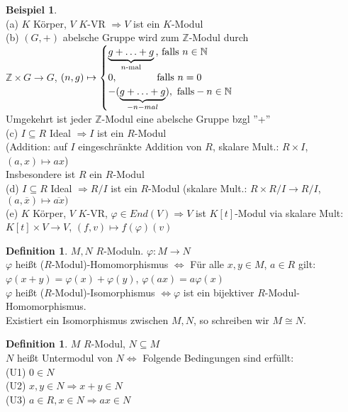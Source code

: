 \documentclass[10pt,a4paper,numbers=endperiod]{scrartcl}
\theoremstyle{definition}
\newtheorem{defi}[satz]{Definition}
\newtheorem{bsp}[satz]{Beispiel}
\def\NN{{\mathbb N}}
\def\ZZ{{\mathbb Z}}
\begin{document}
\begin{bsp}
	$ $\\
	(a) $K$ Körper, $V$ $K$-VR $\Rightarrow V$ ist ein $K$-Modul\\
	(b) $(G, +)$ abelsche Gruppe wird zum $\ZZ$-Modul durch \\
	$\ZZ \times G \rightarrow G$, $(n,g) \mapsto \begin{cases}
	\underbrace{g+ \ldots + g}_{n \text{-mal}} \text{, falls } n \in \NN\\
	0, \hspace{14mm} \text{falls } n = 0\\
	-(\underbrace{g+ \ldots + g}_{-n - mal}), \text{ falls} -n \in \NN
	\end{cases}$\\
	Umgekehrt ist jeder $\ZZ$-Modul eine abelsche Gruppe bzgl ''+''\\
	(c) $I \subseteq R$ Ideal $\Rightarrow I$ ist ein $R$-Modul\\
	(Addition: auf $I$ eingeschränkte Addition von $R$, skalare Mult.: $R \times I$, $(a,x) \mapsto ax$)\\
	Insbesondere ist $R$ ein $R$-Modul\\
	(d) $I \subseteq R$ Ideal $\Rightarrow R/I$ ist ein $R$-Modul (skalare Mult.: $R \times R/I \rightarrow R/I$, $(a, \overline{x}) \mapsto \overline{ax})$\\
	(e) $K$ Körper, $V$ $K$-VR, $\varphi \in End(V) \Rightarrow V$ ist $K[t]$-Modul via skalare Mult: $K[t] \times V \rightarrow V$, $(f,v) \mapsto f(\varphi)(v)$
\end{bsp}

\begin{defi}
	$M, N$ $R$-Moduln. $\varphi: M \rightarrow N$\\
	$\varphi$ heißt ($R$-Modul)-Homomorphismus $\Leftrightarrow$ Für alle $x, y \in M$, $a \in R$ gilt:\\
	$\varphi(x+y) = \varphi(x) + \varphi(y)$, $\varphi(ax) = a \varphi(x)$\\
	$\varphi$ heißt ($R$-Modul)-Isomorphismus $\Leftrightarrow \varphi$ ist ein bijektiver $R$-Modul-Homomorphismus.\\
	Existiert ein Isomorphismus zwischen $M, N$, so schreiben wir $M \cong N$.
\end{defi}

\begin{defi}
	$M$ $R$-Modul, $N \subseteq M$\\
	$N$ heißt Untermodul von $N \Leftrightarrow$ Folgende Bedingungen sind erfüllt:\\
	(U1) $0 \in N$\\
	(U2) $x, y \in N \Rightarrow x + y \in N$\\
	(U3) $a \in R, x \in N \Rightarrow ax \in N$
\end{defi}
\end{document}
